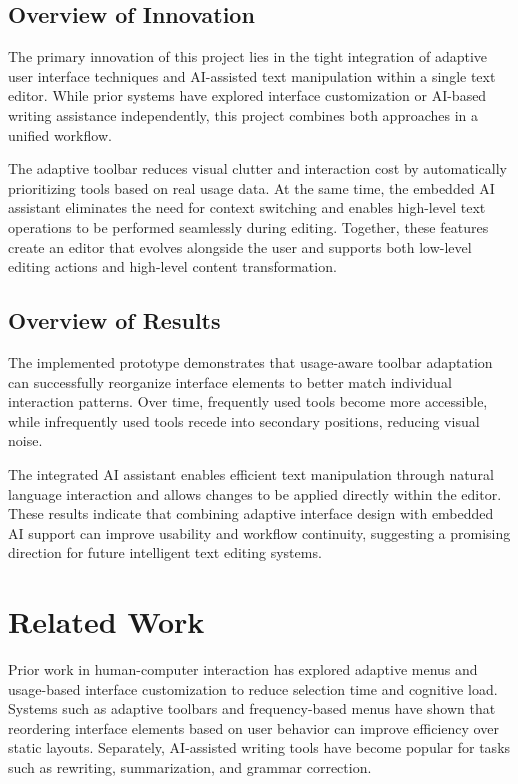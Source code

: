 \documentclass[sigconf]{acmart}
\begin{document}
\subsection{Overview of Innovation}

The primary innovation of this project lies in the tight integration of adaptive user interface techniques and AI-assisted text manipulation within a single text editor. While prior systems have explored interface customization or AI-based writing assistance independently, this project combines both approaches in a unified workflow.

The adaptive toolbar reduces visual clutter and interaction cost by automatically prioritizing tools based on real usage data. At the same time, the embedded AI assistant eliminates the need for context switching and enables high-level text operations to be performed seamlessly during editing. Together, these features create an editor that evolves alongside the user and supports both low-level editing actions and high-level content transformation.

\subsection{Overview of Results}

The implemented prototype demonstrates that usage-aware toolbar adaptation can successfully reorganize interface elements to better match individual interaction patterns. Over time, frequently used tools become more accessible, while infrequently used tools recede into secondary positions, reducing visual noise.

The integrated AI assistant enables efficient text manipulation through natural language interaction and allows changes to be applied directly within the editor. These results indicate that combining adaptive interface design with embedded AI support can improve usability and workflow continuity, suggesting a promising direction for future intelligent text editing systems.


\section{Related Work}

Prior work in human-computer interaction has explored adaptive menus and usage-based interface customization to reduce selection time and cognitive load. Systems such as adaptive toolbars and frequency-based menus have shown that reordering interface elements based on user behavior can improve efficiency over static layouts. Separately, AI-assisted writing tools have become popular for tasks such as rewriting, summarization, and grammar correction.
\end{document}
